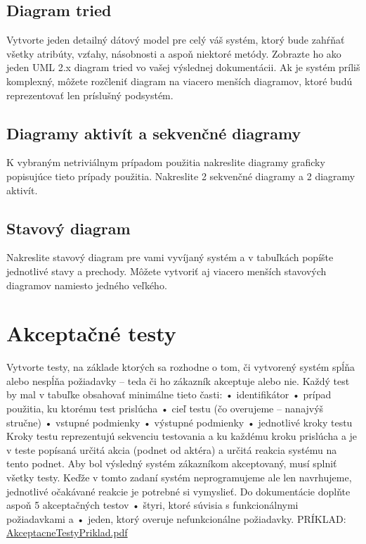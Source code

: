 \subsection{Diagram tried}
Vytvorte jeden detailný dátový model pre celý váš systém, ktorý bude zahŕňať
všetky atribúty, vzťahy, násobnosti a aspoň niektoré metódy. Zobrazte ho ako jeden UML 2.x
diagram tried vo vašej výslednej dokumentácii. Ak je systém príliš komplexný, môžete rozčleniť
diagram na viacero menších diagramov, ktoré budú reprezentovať len príslušný podsystém.

\subsection{Diagramy aktivít a sekvenčné diagramy}
K vybraným netriviálnym prípadom použitia nakreslite
diagramy graficky popisujúce tieto prípady použitia. Nakreslite 2 sekvenčné diagramy a 2
diagramy aktivít.

\subsection{Stavový diagram}
Nakreslite stavový diagram pre vami vyvíjaný systém a v tabuľkách popíšte
jednotlivé stavy a prechody. Môžete vytvoriť aj viacero menších stavových diagramov namiesto
jedného veľkého.


\section{Akceptačné testy}
Vytvorte testy, na základe ktorých sa rozhodne o tom, či vytvorený systém spĺňa alebo nespĺňa
požiadavky – teda či ho zákazník akceptuje alebo nie. Každý test by mal v tabuľke obsahovať minimálne
tieto časti:
• identifikátor
• prípad použitia, ku ktorému test prislúcha
• cieľ testu (čo overujeme – nanajvýš stručne)
• vstupné podmienky
• výstupné podmienky
• jednotlivé kroky testu
Kroky testu reprezentujú sekvenciu testovania a ku každému kroku prislúcha a je v teste popísaná určitá
akcia (podnet od aktéra) a určitá reakcia systému na tento podnet. Aby bol výsledný systém zákazníkom
akceptovaný, musí splniť všetky testy. Keďže v tomto zadaní systém neprogramujeme ale len
navrhujeme, jednotlivé očakávané reakcie je potrebné si vymyslieť.
Do dokumentácie doplňte aspoň 5 akceptačných testov
• štyri, ktoré súvisia s funkcionálnymi požiadavkami a
• jeden, ktorý overuje nefunkcionálne požiadavky.
PRÍKLAD: \href{https://uim.fei.stuba.sk/wp-content/uploads/2022/10/AkceptacneTestyPriklad.pdf}{AkceptacneTestyPriklad.pdf}

